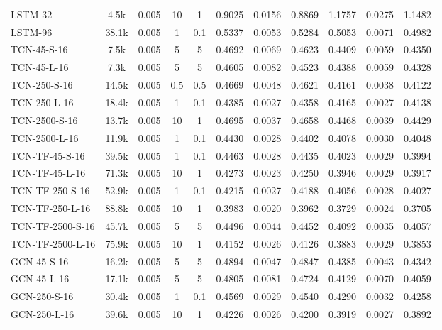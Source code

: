 \begin{table*}[h]
{\begin{tabular}{l c c cc >{\columncolor{gray!20}}ccc >{\columncolor{gray!20}}ccc}
            \hline
            LSTM-32 & 4.5k & 0.005 & 10 & 1 & 0.9025 & 0.0156 & 0.8869 & 1.1757 & 0.0275 & 1.1482 \\
            LSTM-96 & 38.1k & 0.005 & 1 & 0.1 & 0.5337 & 0.0053 & 0.5284 & 0.5053 & 0.0071 & 0.4982 \\
            \hline
            TCN-45-S-16 & 7.5k & 0.005 & 5 & 5 & 0.4692 & 0.0069 & 0.4623 & 0.4409 & 0.0059 & 0.4350 \\
            TCN-45-L-16 & 7.3k & 0.005 & 5 & 5 & 0.4605 & 0.0082 & 0.4523 & 0.4388 & 0.0059 & 0.4328 \\
            TCN-250-S-16 & 14.5k & 0.005 & 0.5 & 0.5 & 0.4669 & 0.0048 & 0.4621 & 0.4161 & 0.0038 & 0.4122 \\
            TCN-250-L-16 & 18.4k & 0.005 & 1 & 0.1 & 0.4385 & 0.0027 & 0.4358 & 0.4165 & 0.0027 & 0.4138 \\
            TCN-2500-S-16 & 13.7k & 0.005 & 10 & 1 & 0.4695 & 0.0037 & 0.4658 & 0.4468 & 0.0039 & 0.4429 \\
            TCN-2500-L-16 & 11.9k & 0.005 & 1 & 0.1 & 0.4430 & 0.0028 & 0.4402 & 0.4078 & 0.0030 & 0.4048 \\
            \hline
            TCN-TF-45-S-16 & 39.5k & 0.005 & 1 & 0.1 & 0.4463 & 0.0028 & 0.4435 & 0.4023 & 0.0029 & 0.3994 \\
            TCN-TF-45-L-16 & 71.3k & 0.005 & 10 & 1 & 0.4273 & 0.0023 & 0.4250 & 0.3946 & 0.0029 & 0.3917 \\
            TCN-TF-250-S-16 & 52.9k & 0.005 & 1 & 0.1 & 0.4215 & 0.0027 & 0.4188 & 0.4056 & 0.0028 & 0.4027 \\
            TCN-TF-250-L-16 & 88.8k & 0.005 & 10 & 1 & 0.3983 & 0.0020 & 0.3962 & 0.3729 & 0.0024 & 0.3705 \\
            TCN-TF-2500-S-16 & 45.7k & 0.005 & 5 & 5 & 0.4496 & 0.0044 & 0.4452 & 0.4092 & 0.0035 & 0.4057 \\
            TCN-TF-2500-L-16 & 75.9k & 0.005 & 10 & 1 & 0.4152 & 0.0026 & 0.4126 & 0.3883 & 0.0029 & 0.3853 \\
            \hline
            GCN-45-S-16 & 16.2k & 0.005 & 5 & 5 & 0.4894 & 0.0047 & 0.4847 & 0.4385 & 0.0043 & 0.4342 \\
            GCN-45-L-16 & 17.1k & 0.005 & 5 & 5 & 0.4805 & 0.0081 & 0.4724 & 0.4129 & 0.0070 & 0.4059 \\
            GCN-250-S-16 & 30.4k & 0.005 & 1 & 0.1 & 0.4569 & 0.0029 & 0.4540 & 0.4290 & 0.0032 & 0.4258 \\
            GCN-250-L-16 & 39.6k & 0.005 & 10 & 1 & 0.4226 & 0.0026 & 0.4200 & 0.3919 & 0.0027 & 0.3892 \\

\end{tabular}}
\end{table*}
